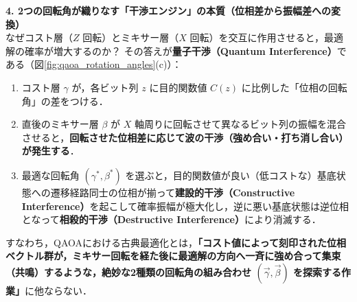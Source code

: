 \documentclass[11pt,a4paper,oneside,openany]{ltjsbook}
\theoremstyle{definition}
\theoremstyle{plain}
\theoremstyle{remark}
\begin{document}
\medskip
\noindent\textbf{4. 2つの回転角が織りなす「干渉エンジン」の本質（位相差から振幅差への変換）}\\[1.5mm]
なぜコスト層（$Z$ 回転）とミキサー層（$X$ 回転）を交互に作用させると，最適解の確率が増大するのか？
その答えが\textbf{量子干渉（Quantum Interference）}である（図\ref{fig:qaoa_rotation_angles}(c)）：
\begin{enumerate}
    \item コスト層 $\gamma$ が，各ビット列 $z$ に目的関数値 $C(z)$ に比例した「位相の回転角」の差をつける．
    \item 直後のミキサー層 $\beta$ が $X$ 軸周りに回転させて異なるビット列の振幅を混合させると，\textbf{回転させた位相差に応じて波の干渉（強め合い・打ち消し合い）が発生する}．
    \item 最適な回転角 $(\gamma^*, \beta^*)$ を選ぶと，目的関数値が良い（低コストな）基底状態への遷移経路同士の位相が揃って\textbf{建設的干渉（Constructive Interference）}を起こして確率振幅が極大化し，逆に悪い基底状態は逆位相となって\textbf{相殺的干渉（Destructive Interference）}により消滅する．
\end{enumerate}
すなわち，QAOAにおける古典最適化とは，\textbf{「コスト値によって刻印された位相ベクトル群が，ミキサー回転を経た後に最適解の方向へ一斉に強め合って集束（共鳴）するような，絶妙な2種類の回転角の組み合わせ $(\vec{\gamma}, \vec{\beta})$ を探索する作業」}に他ならない．
\end{document}

